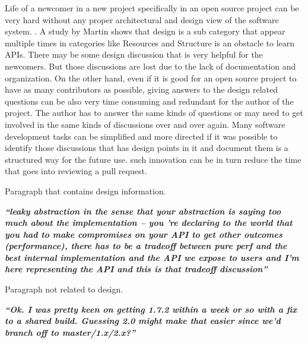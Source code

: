 Life of a newcomer in a new project specifically in an open source project can be very hard without any proper architectural and design view of the software system. \cite{Steinmacher2014}. A study by Martin \cite{Robillard2009} shows that design is a sub category that appear multiple times in categories like Resources and Structure is an obstacle to learn APIs. There may be some design discussion that is very helpful for the newcomers. But those discussions are lost due to the lack of documentation and organization. On the other hand, even if it is good for an open source project to have as many contributors as possible, giving answers to the design related questions can be also very time consuming and redundant for the author of the project. The author has to answer the same kinds of questions or may need to get involved in the same kinds of discussions over and over again. Many software development tasks can be simplified and more directed if it was possible to identify those discussions that has design points in it and document them is a structured way for the future use. such innovation can be in turn reduce the time that goes into reviewing a pull request.
\begin{table}
	\caption{Paragraph that contains design information.\cite{Viviani2018}}	
		\textbf{\textit{``leaky abstraction in the sense that your abstraction is saying too much about the implementation -- you 're declaring to the world that you had to make compromises on your API to get other outcomes (performance), there has to be a tradeoff between pure perf and the best internal implementation and the API we expose to users and I'm here representing the API and this is that tradeoff discussion''}}	
\end{table}
\begin{table}
	\caption{Paragraph not related to design.\cite{Viviani2018}}
	\textbf{\textit{``Ok. I was pretty keen on getting 1.7.2 within a week or so with a fix to a shared build. Guessing 2.0 might make that easier since we'd branch off to master/1.x/2.x?''}}
\end{table}

